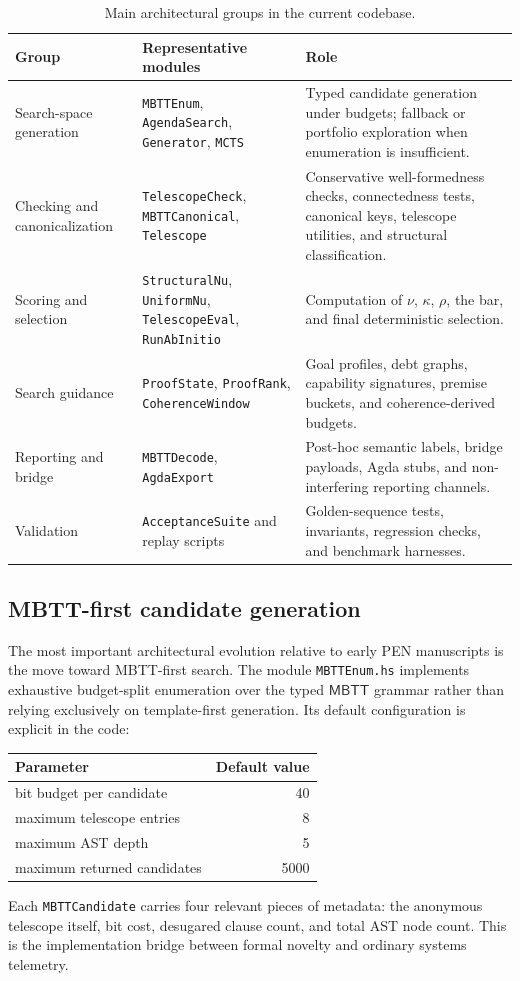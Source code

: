 \documentclass[pdflatex,sn-mathphys,Numbered]{sn-jnl}
\theoremstyle{thmstyleone}
\theoremstyle{thmstylethree}
\theoremstyle{thmstyletwo}
\newcommand{\MBTT}{\ensuremath{\mathsf{MBTT}}}
\begin{document}
\begin{table}[t]
\centering
\caption{Main architectural groups in the current codebase.}
\label{tab:modules}
\footnotesize
\begin{tabular}{@{}p{2.6cm}p{3.2cm}p{5.7cm}@{}}
\toprule
Group & Representative modules & Role \\
\midrule
Search-space generation & \texttt{MBTTEnum}, \texttt{AgendaSearch}, \texttt{Generator}, \texttt{MCTS} & Typed candidate generation under budgets; fallback or portfolio exploration when enumeration is insufficient. \\
Checking and canonicalization & \texttt{TelescopeCheck}, \texttt{MBTTCanonical}, \texttt{Telescope} & Conservative well-formedness checks, connectedness tests, canonical keys, telescope utilities, and structural classification. \\
Scoring and selection & \texttt{StructuralNu}, \texttt{UniformNu}, \texttt{TelescopeEval}, \texttt{RunAbInitio} & Computation of $\nu$, $\kappa$, $\rho$, the bar, and final deterministic selection. \\
Search guidance & \texttt{ProofState}, \texttt{ProofRank}, \texttt{CoherenceWindow} & Goal profiles, debt graphs, capability signatures, premise buckets, and coherence-derived budgets. \\
Reporting and bridge & \texttt{MBTTDecode}, \texttt{AgdaExport} & Post-hoc semantic labels, bridge payloads, Agda stubs, and non-interfering reporting channels. \\
Validation & \texttt{AcceptanceSuite} and replay scripts & Golden-sequence tests, invariants, regression checks, and benchmark harnesses. \\
\bottomrule
\end{tabular}
\end{table}

\subsection{MBTT-first candidate generation}

The most important architectural evolution relative to early PEN manuscripts is the move toward MBTT-first search. The module \texttt{MBTTEnum.hs} implements exhaustive budget-split enumeration over the typed \MBTT{} grammar rather than relying exclusively on template-first generation. Its default configuration is explicit in the code:
\begin{center}
\begin{tabular}{@{}lr@{}}
\toprule
Parameter & Default value \\
\midrule
bit budget per candidate & 40 \\
maximum telescope entries & 8 \\
maximum AST depth & 5 \\
maximum returned candidates & 5000 \\
\bottomrule
\end{tabular}
\end{center}
Each \texttt{MBTTCandidate} carries four relevant pieces of metadata: the anonymous telescope itself, bit cost, desugared clause count, and total AST node count. This is the implementation bridge between formal novelty and ordinary systems telemetry.
\end{document}
